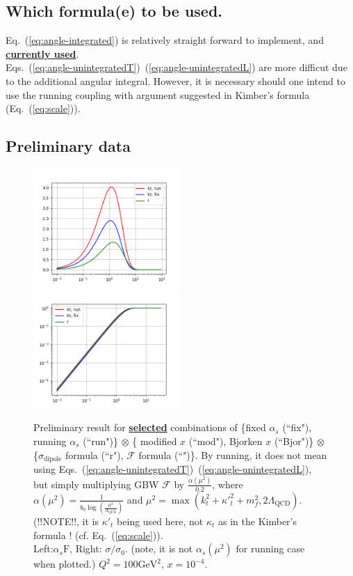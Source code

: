 \documentclass[12pt]{article}
\begin{document}
\subsection{Which formula(e) to be used.}
Eq.~(\ref{eq:angle-integrated}) is relatively straight forward to implement, and \underline{\textbf{currently used}}. \\
Eqs.~(\ref{eq:angle-unintegratedT})~(\ref{eq:angle-unintegratedL}) are more difficut due to the additional angular integral. However, it is necessary should one intend to use the running coupling with argument suggested in Kimber's formula (Eq.~(\ref{eq:scale})).
\subsection{Preliminary data}
\begin{figure}
\includegraphics[width=0.5\textwidth]{./preliminary.png}
\includegraphics[width=0.5\textwidth]{./preliminary-dipole.png}
\caption{\footnotesize Preliminary result for \underline{\textbf{selected}} combinations of \{fixed $\alpha_s$ (``fix"), running $\alpha_s$ (``run")\}  $\otimes$ \{ modified $x$ (``mod"), Bjorken $x$ (``Bjor")\}  $\otimes$ \{$\sigma_\mathrm{dipole}$ formula (``r"), $\mathcal{F}$ formula (``")\}.
By running, it does not mean using Eqs.~(\ref{eq:angle-unintegratedT})~(\ref{eq:angle-unintegratedL}), but simply multiplying GBW $\mathcal{F}$ by $\frac{ \alpha(\mu^2) }{0.2}$, where $\alpha(\mu^2)=\frac{1}{b_0 \log\left(\frac{\mu^2}{\Lambda_\mathrm{QCD} }\right)}$ and $\mu^2=\max( k^2_t+{\kappa'}_t^2+m_f^2,2\Lambda_\mathrm{QCD})$. (!!NOTE!!, it is ${\kappa'}_t$ being used here, not $\kappa_t$ as in the Kimber's formula ! (cf. Eq.~(\ref{eq:scale})).\\
Left:$ \alpha_s\mathrm{F}$, Right: $\sigma/\sigma_0$. (note, it is not $\alpha_s(\mu^2)$ for running case when plotted.) $Q^2=100\mathrm{GeV^2}$, $x=10^{-4}$.
}
\end{figure}
\end{document}
